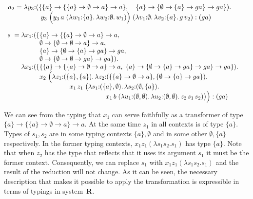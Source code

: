 \documentclass{easychair}
\theoremstyle{plain}%
\renewcommand{\:}{\mbox{:}\xspace}
\begin{document}
\medskip

$
  \begin{array}{l@{\;}c@{\;}lllll}
    a_2 & = & \lambda y_3\:(\{ \{a\} \to \{\{a\} \to \emptyset \to a\} \to a\},\quad
                               \{a\} \to \{\emptyset \to \{a\} \to ga\} \to ga \}).\,\\ & &
               \multicolumn{2}{l}{\qquad y_3\;\Bigl(y_3\, a\; (\lambda w_1\:\{a\}.\, \lambda w_2\:\emptyset.\, w_1)\Bigr)
               \;(\lambda v_1\:\emptyset.\, \lambda v_2\:\{a\}.\, g\, v_2) : (ga)}\\
  \end{array}
$

\medskip

$
\begin{array}{l@{\;}c@{\;}l@{}l@{}l@{}ll}
      s\; & = & \lambda x_1\: (\{ & \multicolumn{3}{@{}l}{\{a\} \to \{\{a\} \to \emptyset \to a\} \to a,}\\ & & &
                                    \multicolumn{3}{@{}l}{\emptyset \to \{\emptyset \to \emptyset \to a\} \to a,}\\ & & &
                                    \multicolumn{3}{@{}l}{\{a\} \to \{\emptyset \to \{a\} \to ga\} \to ga,}\\ & & &
                                    \multicolumn{3}{@{}l}{\emptyset \to \{\emptyset \to \emptyset \to ga\} \to ga\}).\,} \\ & & 
               \lambda x_2\: (\{&   \multicolumn{3}{@{}l}{\{ \{a\} \to \{\{a\} \to \emptyset \to a\} \to a,\;
                                                             \{a\} \to \{\emptyset \to \{a\} \to ga\} \to ga \} \to ga\}).\,}
                &\\ & & & 
                x_2\;\Bigl(
                \lambda z_1\:(\{ & \multicolumn{2}{@{}l}{a\}, \{a\}).\, \lambda z_2\:(\{\{a\} \to \emptyset \to a\}, \{\emptyset \to \{a\} \to ga\}).\,} \\ & & & &
    x_1\, z_1\;
    \bigl(
      \lambda s_1\:(\{ & a\}, \emptyset).\, \lambda s_2\:(\emptyset, \{a\}).\,\\ & & & & &
      x_1\, b\;
      (\lambda u_1\:(\emptyset,\emptyset).\, \lambda u_2\:(\emptyset,\emptyset).\,
      z_2\, s_1\, s_2)
    \bigr)
  \Bigr) : (ga)

  \end{array}
  $

\medskip

\noindent
We can see from the typing that $x_1$ can serve faithfully as a transformer of type
$\{a\} \to \{\{a\} \to \emptyset \to a\} \to a$. At the same time $z_1$ in all contexts is of type $\{a\}$.
Types of $s_1, s_2$ are in some typing contexts $\{a\}, \emptyset$ and in some other $\emptyset, \{a\}$ respectively.
In the former typing contexts, $x_1z_1(\lambda s_1s_2.s_1)$ has type $\{a\}$.
Note that when $z_2$ has the type that reflects that it uses its argument $s_1$ it must be the former context.
Consequently, we can replace $s_1$ with $x_1z_1(\lambda s_1s_2.s_1)$ and the result of the reduction will not change.
As it can be seen, the necessary description that makes it possible to apply the transformation is expressible in terms of typings in system~\textbf{R}.

  
\label{sect:bib}


\end{document}
